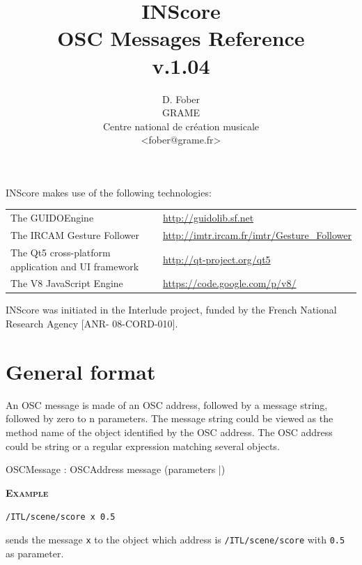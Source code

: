 \documentclass[a4paper,twoside]{report}
\newcommand{\toplevel}[1]	{\chapter{#1}}
\newcommand{\OSC}[1]		{\texttt{#1}}
\newcommand{\example}		{\textbf{\hspace{-1.5cm}\textbf{\textsc{Example }}}}
\newcommand{\sample}	[1]			{\vspace{-2mm}\begin{center}\colorbox{mygrey}{
								\begin{minipage}[t]{0.9\columnwidth} 
								{\small \texttt{#1}}
								\end{minipage}}\end{center}}
\begin{document}
\title{INScore \\ OSC Messages Reference \\v.1.04}

\author{D. Fober\\ GRAME\\ Centre national de cr\'eation musicale\\
{\small <fober@grame.fr>} \\
}

\maketitle

\vspace*{18cm}
 
{\small INScore makes use of the following technologies:}
\begin{table}[h]
\begin{tabular}{ll}
{\small The GUIDOEngine}  						& {\small \url{http://guidolib.sf.net}} \\
{\small The IRCAM Gesture Follower} 				& {\small \url{http://imtr.ircam.fr/imtr/Gesture_Follower}} \\
{\small The Qt5 cross-platform application and UI framework} & {\small \url{http://qt-project.org/qt5}} \\
{\small The V8 JavaScript Engine} 				& {\small \url{https://code.google.com/p/v8/}}
\end{tabular}
\end{table}%

{\small INScore was initiated in the Interlude project, funded by the French National Research Agency [ANR- 08-CORD-010].}
  

\pagestyle{empty}
\cleardoublepage
\tableofcontents
\newpage
\pagestyle{plain}
\setcounter{page}{1}

\toplevel{General format}
\label{genformat}
An OSC message is made of an OSC address, followed by a message string, followed by zero to n parameters. The message string could be viewed as the method name of the object identified by the OSC address.
The OSC address could be string or a regular expression matching several objects.
\begin{rail}
OSCMessage : OSCAddress message (parameters |)
\end{rail}
\example
\sample{/ITL/scene/score x 0.5}
sends the message \OSC{x} to the object which address is \OSC{/ITL/scene/score} with \OSC{0.5} as parameter.
\end{document}
